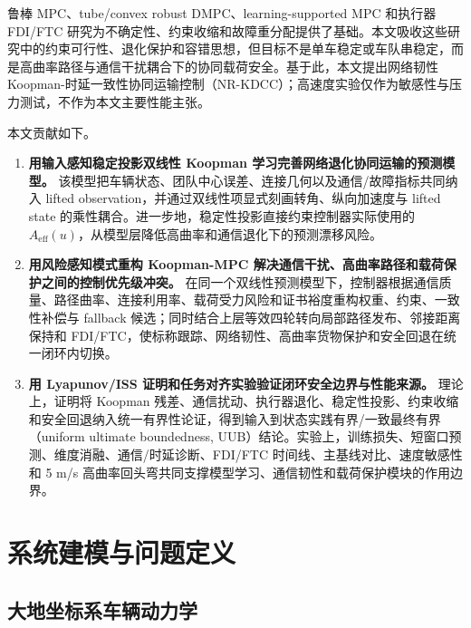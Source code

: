 \documentclass[twocolumn,3p,times,procedia]{elsarticle}
\newcommand{\Method}{NR-KDCC}
\begin{document}
鲁棒 MPC、tube/convex robust DMPC、learning-supported MPC 和执行器 FDI/FTC 研究为不确定性、约束收缩和故障重分配提供了基础\cite{mayne2000constrainedMpc,mayne2005robustMpc,convexRobustDMPC2025ejc,gasparino2023nnMpcUncertainty,liu2024adaptiveFtcSbw,xu2024fdFtcSteering}。本文吸收这些研究中的约束可行性、退化保护和容错思想，但目标不是单车稳定或车队串稳定，而是高曲率路径与通信干扰耦合下的协同载荷安全。基于此，本文提出网络韧性 Koopman-时延一致性协同运输控制（\Method{}）；高速度实验仅作为敏感性与压力测试，不作为本文主要性能主张。

本文贡献如下。
\begin{enumerate}
\item \textbf{用输入感知稳定投影双线性 Koopman 学习完善网络退化协同运输的预测模型。} 该模型把车辆状态、团队中心误差、连接几何以及通信/故障指标共同纳入 lifted observation，并通过双线性项显式刻画转角、纵向加速度与 lifted state 的乘性耦合。进一步地，稳定性投影直接约束控制器实际使用的 $A_{\mathrm{eff}}(u)$，从模型层降低高曲率和通信退化下的预测漂移风险。
\item \textbf{用风险感知模式重构 Koopman-MPC 解决通信干扰、高曲率路径和载荷保护之间的控制优先级冲突。} 在同一个双线性预测模型下，控制器根据通信质量、路径曲率、连接利用率、载荷受力风险和证书裕度重构权重、约束、一致性补偿与 fallback 候选；同时结合上层等效四轮转向局部路径发布、邻接距离保持和 FDI/FTC，使标称跟踪、网络韧性、高曲率货物保护和安全回退在统一闭环内切换。
\item \textbf{用 Lyapunov/ISS 证明和任务对齐实验验证闭环安全边界与性能来源。} 理论上，证明将 Koopman 残差、通信扰动、执行器退化、稳定性投影、约束收缩和安全回退纳入统一有界性论证，得到输入到状态实践有界/一致最终有界（uniform ultimate boundedness, UUB）结论。实验上，训练损失、短窗口预测、维度消融、通信/时延诊断、FDI/FTC 时间线、主基线对比、速度敏感性和 5 m/s 高曲率回头弯共同支撑模型学习、通信韧性和载荷保护模块的作用边界。
\end{enumerate}

\section{系统建模与问题定义}

\subsection{大地坐标系车辆动力学}
\end{document}
